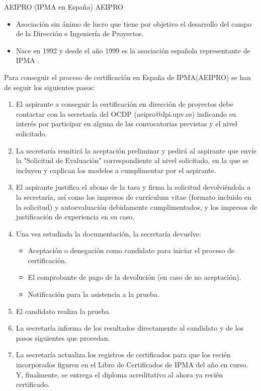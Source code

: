 \begin{frame}[allowframebreaks]{AEIPRO (IPMA en España)}
	AEIPRO 
	\begin{itemize}
		\item Asociación sin ánimo de lucro que tiene por objetivo el desarrollo del campo de la Dirección e Ingeniería de Proyectos.
		\item Nace en 1992 y desde el año 1999 es la asociación española representante de IPMA .
	\end{itemize}
	
	\framebreak
	
	Para conseguir el proceso de certificación en España de IPMA(AEIPRO) se han de seguir los siguientes pasos:
	
	\begin{enumerate}
		\item El aspirante a conseguir la certificación en dirección de proyectos debe contactar con la secretaría del OCDP (aeipro@dpi.upv.es) indicando su interés por participar en alguna de las convocatorias previstas y el nivel solicitado.
		\item La secretaría remitirá la aceptación preliminar y pedirá al aspirante que envíe la "Solicitud de Evaluación" correspondiente al nivel solicitado, en la que se incluyen y explican los modelos a cumplimentar por el aspirante.
		\item El aspirante justifica el abono de la tasa y firma la solicitud devolviéndola a la secretaría, así como los impresos de currículum vitae (formato incluido en la solicitud) y autoevaluación debidamente cumplimentados, y los impresos de justificación de experiencia en su caso.
		\framebreak
		\item Una vez estudiada la documentación, la secretaría devuelve:
		\begin{itemize}
			\item Aceptación o denegación como candidato para iniciar el proceso de certificación.
			\item El comprobante de pago de la devolución (en caso de no aceptación).
			\item Notificación para la asistencia a la prueba.
		\end{itemize}
		\item El candidato realiza la prueba.
		\item La secretaría informa de los resultados directamente al candidato y de los pasos siguientes que procedan.
		\item La secretaría actualiza los registros de certificados para que los recién incorporados figuren en el Libro de Certificados de IPMA del año en curso. Y, finalmente, se entrega el diploma acreditativo al ahora ya recién certificado.
		

\end{enumerate}
\end{frame}
